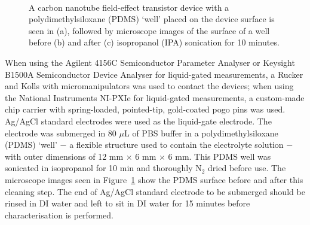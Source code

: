 \documentclass[
  letterpaper,
  DIV=11,
  numbers=noendperiod]{scrartcl}
\begin{document}
\begin{figure}
\begin{minipage}[t]{0.47\linewidth}
{{}

}

\subcaption{\label{fig-PDMS_dirty}}
\end{minipage}%
%
\begin{minipage}[t]{0.05\linewidth}

{\centering 

~

}

\end{minipage}%
%
\begin{minipage}[t]{0.47\linewidth}

{\centering 


}

\subcaption{\label{fig-PDMS_clean}}
\end{minipage}%

\caption{\label{fig-PDMS-clean}A carbon nanotube field-effect transistor
device with a polydimethylsiloxane (PDMS) `well' placed on the device
surface is seen in (a), followed by microscope images of the surface of
a well before (b) and after (c) isopropanol (IPA) sonication for 10
minutes.}

\end{figure}

When using the Agilent 4156C Semiconductor Parameter Analyser or
Keysight B1500A Semiconductor Device Analyser for liquid-gated
measurements, a Rucker and Kolls with micromanipulators was used to
contact the devices; when using the National Instruments NI-PXIe for
liquid-gated measurements, a custom-made chip carrier with
spring-loaded, pointed-tip, gold-coated pogo pins was used. Ag/AgCl
standard electrodes were used as the liquid-gate electrode. The
electrode was submerged in 80 \(\mu\)L of PBS buffer in a
polydimethylsiloxane (PDMS) `well' \(-\) a flexible structure used to
contain the electrolyte solution \(-\) with outer dimensions of 12 mm
\(\times\) 6 mm \(\times\) 6 mm. This PDMS well was sonicated in
isopropanol for 10 min and thoroughly N\(_2\) dried before use. The
microscope images seen in Figure~\ref{fig-PDMS-clean} show the PDMS
surface before and after this cleaning step. The end of Ag/AgCl standard
electrode to be submerged should be rinsed in DI water and left to sit
in DI water for 15 minutes before characterisation is performed.
\end{document}
